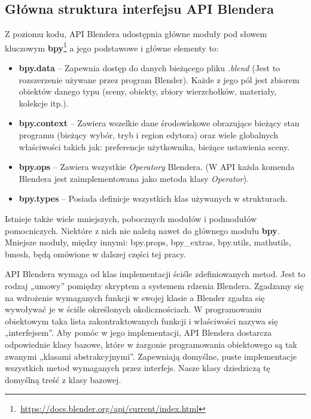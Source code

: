 \documentclass{xmgr}
\begin{document}
\subsection{Główna struktura interfejsu API Blendera}
Z poziomu kodu, API Blendera udostępnia główne moduły pod słowem kluczowym \textbf{bpy}\footnote{\,\url{https://docs.blender.org/api/current/index.html}} a jego podstawowe i główne elementy to:
\begin{itemize}
\item \textbf{bpy.data} -- Zapewnia dostęp do danych bieżącego pliku \emph{.blend} (Jest to rozszerzenie używane przez program Blender). Każde z jego pól jest zbiorem obiektów danego typu (sceny, obiekty, zbiory wierzchołków, materiały, kolekcje itp.).
\item \textbf{bpy.context} -- Zawiera wszelkie dane środowiskowe obrazujące bieżący stan programu (bieżący wybór, tryb i region edytora) oraz wiele globalnych właściwości takich jak: preferencje użytkownika, bieżące ustawienia sceny.
\item \textbf{bpy.ops} -- Zawiera wszystkie \emph{Operatory} Blendera. (W API każda komenda Blendera jest zaimplementowana jako metoda klasy \emph{Operator}).
\item \textbf{bpy.types} -- Posiada definicje wszystkich klas używanych w strukturach.
\end{itemize}
Istnieje także wiele mniejszych, pobocznych modułów i podmodułów pomocniczych. Niektóre z nich nie należą nawet do głównego modułu \textbf{bpy}. Mniejsze moduły, między innymi: bpy.props, bpy\_extras, bpy.utils, mathutils, bmesh, będą omówione w dalszej części tej pracy.

API Blendera wymaga od klas implementacji ściśle zdefiniowanych metod. Jest to rodzaj „umowy” pomiędzy skryptem a systemem rdzenia Blendera. Zgadzamy się na wdrożenie wymaganych funkcji w swojej klasie a Blender zgadza się wywoływać je w ściśle określonych okolicznościach. W programowaniu obiektowym taka lista zakontraktowanych funkcji i właściwości nazywa się „interfejsem”. Aby pomóc w jego implementacji, API Blendera dostarcza odpowiednie klasy bazowe, które w żargonie programowania obiektowego są tak zwanymi „klasami abstrakcyjnymi”. Zapewniają domyślne, puste implementacje wszystkich metod wymaganych przez interfejs. Nasze klasy dziedziczą tę domyślną treść z klasy bazowej.
\end{document}

